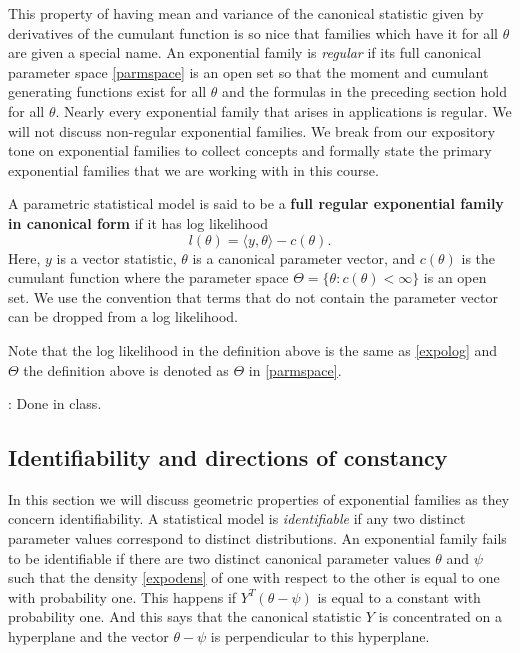 \documentclass[
]{article}
\begin{document}
This property of having mean and variance of the canonical statistic
given by derivatives of the cumulant function is so nice that families
which have it for all \(\theta\) are given a special name. An
exponential family is \emph{regular} if its full canonical parameter
space \eqref{parmspace} is an open set so that the moment and cumulant
generating functions exist for all \(\theta\) and the formulas in the
preceding section hold for all \(\theta\). Nearly every exponential
family that arises in applications is regular. We will not discuss
non-regular exponential families. We break from our expository tone on
exponential families to collect concepts and formally state the primary
exponential families that we are working with in this course.

\begin{defn}
A parametric statistical model is said to be a \textbf{full regular exponential family in canonical form} if it has log likelihood 
$$
    l(\theta) = \langle y, \theta \rangle - c(\theta).
$$
Here, $y$ is a vector statistic, $\theta$ is a canonical parameter vector, and $c(\theta)$ is the cumulant function where the parameter space $\Theta = \{\theta: c(\theta) < \infty\}$ is an open set. We use the convention that terms that do not contain the parameter vector can be dropped from a log likelihood. 
\end{defn}

Note that the log likelihood in the definition above is the same as
\eqref{expolog} and \(\Theta\) the definition above is denoted as
\(\Theta\) in \eqref{parmspace}.

\vspace{0.5cm}

: Done in class.

\hypertarget{identifiability-and-directions-of-constancy}{%
\subsection{Identifiability and directions of
constancy}\label{identifiability-and-directions-of-constancy}}

In this section we will discuss geometric properties of exponential
families as they concern identifiability. A statistical model is
\emph{identifiable} if any two distinct parameter values correspond to
distinct distributions. An exponential family fails to be identifiable
if there are two distinct canonical parameter values \(\theta\) and
\(\psi\) such that the density \eqref{expodens} of one with respect to
the other is equal to one with probability one. This happens if
\(Y^T(\theta - \psi)\) is equal to a constant with probability one. And
this says that the canonical statistic \(Y\) is concentrated on a
hyperplane and the vector \(\theta - \psi\) is perpendicular to this
hyperplane.
\end{document}
